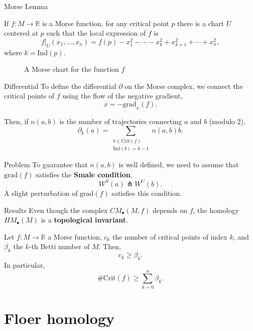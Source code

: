 \documentclass{beamer}
\newcommand{\con}[1]{\mathbb{#1}}
\newcommand{\R}{\con{R}}
\begin{document}
\begin{frame}{Morse Lemma}
	\begin{theorem}
		If $f : M \rightarrow \R$ is a Morse function, for any critical point $p$ there is a chart $U$ centered at $p$ such that the local expression of $f$ is
		\[\left. f\right|_U(x_1,...,x_n) = f(p) - x_1^2 - \cdots - x_k^2 + x_{k+1}^2 + \cdots + x_n^2,\]
		where $k = \mathrm{Ind}(p)$.
	\end{theorem}

	\begin{figure}
		
		\label{figure:morse_chart}
		\caption{A Morse chart for the function $f$}
	\end{figure}
\end{frame}

\begin{frame}{Differential}
	To define the differential $\partial$ on the Morse complex, we connect the critical points of $f$ using the flow of the negative gradient,
	\[\dot{x} = - \mathrm{grad}_x (f) .\]

	Then, if $n(a,b)$ is the number of trajectories connecting $a$ and $b$ (modulo 2),
	\[\partial_k(a) = \sum_{\substack{b \in \mathrm{Crit}(f) \\ \mathrm{Ind}(b) = k-1}} n(a,b) b .\]

	\begin{block}{Problem}
		To guarantee that $n(a,b)$ is well defined, we need to assume that $\mathrm{grad}(f)$ satisfies the {\bf Smale condition},
		\[W^S(a) \pitchfork W^U(b) .\]
		A slight perturbation of $\mathrm{grad}(f)$ satisfies this condition.
	\end{block}
\end{frame}

\begin{frame}{Results}
	Even though the complex $CM_{\bullet}(M,f)$ depends on $f$, the homology $HM_{\bullet}(M)$ is a {\bf topological invariant}.

	\begin{theorem}
		Let $f : M \rightarrow \R$ a Morse function, $c_k$ the number of critical points of index $k$, and $\beta_k$ the $k$-th Betti number of $M$. Then,
		\[c_k \geq \beta_k .\]
		In particular,
		\[\# \mathrm{Crit}(f) \geq \sum_{k=0}^n \beta_k .\]
	\end{theorem}
\end{frame}

\section{Floer homology}
\end{document}
